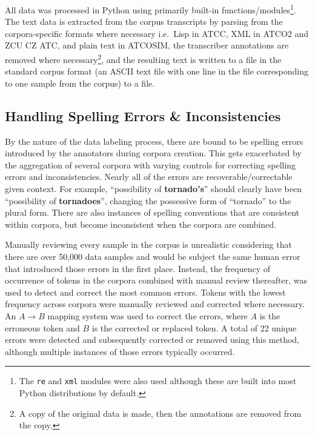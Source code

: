 \documentclass[12pt]{article}
\begin{document}
All data was processed in Python using primarily built-in functions/modules\footnote{The \lstinline|re| and \lstinline|xml| modules were also used
    although these are built into most Python distributions by default.}. The text data is extracted from the corpus transcripts by parsing from the
corpora-specific formats where necessary i.e.~Lisp in ATCC, XML in ATCO2 and ZCU CZ ATC, and plain text in ATCOSIM, the transcriber annotations
are removed where necessary\footnote{A copy of the original data is made, then the annotations are removed from the copy.}, and the resulting text
is written to a file in the standard corpus format (an ASCII text file with one line in the file corresponding to one sample from the corpus) to a
file.

\subsection{Handling Spelling Errors \& Inconsistencies}\label{sec:spelling_errors}
By the nature of the data labeling process, there are bound to be spelling errors introduced by the annotators during corpora creation. This gets
exacerbated by the aggregation of several corpora with varying controls for correcting spelling errors and inconsistencies. Nearly all of the errors
are recoverable/correctable given context. For example, ``possibility of \textbf{tornado's}'' should clearly have been ``possibility of
\textbf{tornadoes}'', changing the possessive form of ``tornado'' to the plural form. There are also instances of spelling conventions that are
consistent within corpora, but become inconsistent when the corpora are combined.

Manually reviewing every sample in the corpus is unrealistic considering that there are over 50,000 data samples and would be subject the same
human error that introduced those errors in the first place. Instead, the frequency of occurrence of tokens in the corpora combined with manual review
thereafter, was used to detect and correct the most common errors. Tokens with the lowest frequency across corpora were manually reviewed and
corrected where necessary. An \(A \rightarrow B\) mapping system was used to correct the errors, where \(A\) is the erroneous token and \(B\) is the
corrected or replaced token. A total of 22 unique errors were detected and subsequently corrected or removed using this method, although multiple
instances of those errors typically occurred.
\end{document}
